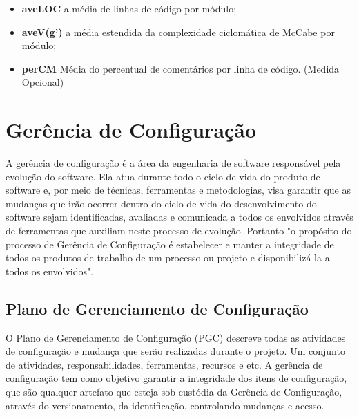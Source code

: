 \begin{itemize}
\item \textbf{aveLOC} a média de linhas de código por módulo;
\end{itemize}
\begin{itemize}
\item \textbf{aveV(g')} a média estendida da complexidade ciclomática de McCabe por módulo;
\end{itemize}

\begin{itemize}
\item \textbf{perCM} Média do percentual de comentários por linha de código. (Medida Opcional)
\end{itemize}


\section{Gerência de Configuração}\label{gerenciadeconfiguracao}
A gerência de configuração é a área da engenharia de software responsável pela evolução do software. Ela atua durante todo o ciclo de vida do produto de software e, por meio de técnicas, ferramentas e metodologias, visa garantir que as mudanças que irão ocorrer dentro do ciclo de vida do desenvolvimento do software sejam identificadas, avaliadas e comunicada a todos os envolvidos através de ferramentas que auxiliam neste processo de evolução.
Portanto "o propósito do processo de Gerência de Configuração é estabelecer e manter a integridade de todos os produtos de trabalho de um processo ou projeto e disponibilizá-la a todos os envolvidos"\space\cite{mpsbr}.
\subsection{Plano de Gerenciamento de Configuração}\label{pgc}
O Plano de Gerenciamento de Configuração (PGC) descreve todas as atividades de configuração e mudança que serão realizadas durante o projeto. Um conjunto de atividades, responsabilidades, ferramentas, recursos e etc. A gerência de configuração tem como objetivo garantir a integridade dos itens de configuração, que são qualquer artefato que esteja sob custódia da Gerência de Configuração, através do versionamento, da identificação, controlando mudanças e acesso. 

